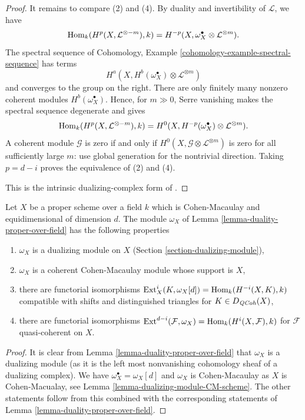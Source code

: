 \begin{proof}
\medskip\noindent
It remains to compare (2) and (4). By duality and invertibility of
$\mathcal{L}$, we have
$$
\mathop{\mathrm{Hom}}\nolimits_k(H^p(X, \mathcal{L}^{\otimes -m}), k) =
H^{-p}(X, \omega_X^\bullet \otimes \mathcal{L}^{\otimes m}).
$$
The spectral sequence of Cohomology, Example
\ref{cohomology-example-spectral-sequence} has terms
$$
H^a(X, H^b(\omega_X^\bullet) \otimes \mathcal{L}^{\otimes m})
$$
and converges to the group on the right. There are only finitely many
nonzero coherent modules $H^b(\omega_X^\bullet)$. Hence, for $m \gg 0$,
Serre vanishing makes the spectral sequence degenerate and gives
$$
\mathop{\mathrm{Hom}}\nolimits_k(H^p(X, \mathcal{L}^{\otimes -m}), k) =
H^0(X, H^{-p}(\omega_X^\bullet) \otimes \mathcal{L}^{\otimes m}).
$$
A coherent module $\mathcal{G}$ is zero if and only if
$H^0(X, \mathcal{G} \otimes \mathcal{L}^{\otimes m})$ is zero for all
sufficiently large $m$: use global generation for the nontrivial direction.
Taking $p = d - i$ proves the equivalence of (2) and (4).

This is the intrinsic dualizing-complex form of
\cite[Expos\'e 149, Th\'eor\`eme 3 bis and Proposition 6,
pp. 186--187]{FGA}.
\end{proof}

\begin{lemma}
\label{lemma-duality-proper-over-field-CM}
Let $X$ be a proper scheme over a field $k$ which is Cohen-Macaulay
and equidimensional of dimension $d$. The module $\omega_X$
of Lemma \ref{lemma-duality-proper-over-field} has the following properties
\begin{enumerate}
\item $\omega_X$ is a dualizing module on $X$
(Section \ref{section-dualizing-module}),
\item $\omega_X$ is a coherent Cohen-Macaulay module whose support is $X$,
\item there are functorial isomorphisms
$\mathop{\mathrm{Ext}}\nolimits^i_X(K, \omega_X[d]) = \mathop{\mathrm{Hom}}\nolimits_k(H^{-i}(X, K), k)$
compatible with shifts and distinguished triangles for $K \in D_{\mathit{QCoh}}(X)$,
\item there are functorial isomorphisms
$\mathop{\mathrm{Ext}}\nolimits^{d - i}(\mathcal{F}, \omega_X) = \mathop{\mathrm{Hom}}\nolimits_k(H^i(X, \mathcal{F}), k)$
for $\mathcal{F}$ quasi-coherent on $X$.
\end{enumerate}
\end{lemma}

\begin{proof}
It is clear from Lemma \ref{lemma-duality-proper-over-field}
that $\omega_X$ is a dualizing module (as it is the left most
nonvanishing cohomology sheaf of a dualizing complex).
We have $\omega_X^\bullet = \omega_X[d]$ and $\omega_X$ is Cohen-Macaulay
as $X$ is Cohen-Macualay, see Lemma \ref{lemma-dualizing-module-CM-scheme}.
The other statements follow from this combined with the
corresponding statements of Lemma \ref{lemma-duality-proper-over-field}.
\end{proof}

